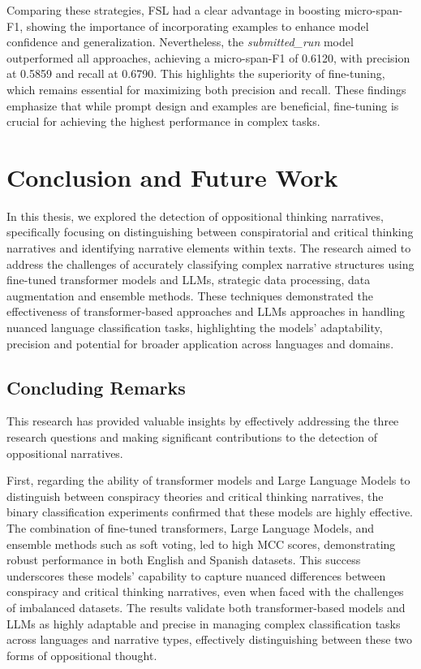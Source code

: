 \documentclass{Configuration_Files/PoliMi3i_thesis}
\begin{document}
Comparing these strategies, FSL had a clear advantage in boosting micro-span-F1, showing the importance of incorporating examples to enhance model confidence and generalization. Nevertheless, the \textit{submitted\_run} model outperformed all approaches, achieving a micro-span-F1 of 0.6120, with precision at 0.5859 and recall at 0.6790. This highlights the superiority of fine-tuning, which remains essential for maximizing both precision and recall. These findings emphasize that while prompt design and examples are beneficial, fine-tuning is crucial for achieving the highest performance in complex tasks.


\chapter{Conclusion and Future Work} \label{chap:conclusion_future_work}
In this thesis, we explored the detection of oppositional thinking narratives, specifically focusing on distinguishing between conspiratorial and critical thinking narratives and identifying narrative elements within texts. The research aimed to address the challenges of accurately classifying complex narrative structures using fine-tuned transformer models and LLMs, strategic data processing, data augmentation and ensemble methods. These techniques demonstrated the effectiveness of transformer-based approaches and LLMs approaches in handling nuanced language classification tasks, highlighting the models' adaptability, precision and potential for broader application across languages and domains.  

\section{Concluding Remarks}
This research has provided valuable insights by effectively addressing the three research questions and making significant contributions to the detection of oppositional narratives.

First, regarding the ability of transformer models and Large Language Models to distinguish between conspiracy theories and critical thinking narratives, the binary classification experiments confirmed that these models are highly effective. The combination of fine-tuned transformers, Large Language Models, and ensemble methods such as soft voting, led to high MCC scores, demonstrating robust performance in both English and Spanish datasets. This success underscores these models' capability to capture nuanced differences between conspiracy and critical thinking narratives, even when faced with the challenges of imbalanced datasets. The results validate both transformer-based models and LLMs as highly adaptable and precise in managing complex classification tasks across languages and narrative types, effectively distinguishing between these two forms of oppositional thought. 
\end{document}
